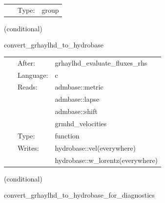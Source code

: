 \documentclass{article}
\begin{document}
 \begin{tabular*}{160mm}{cll} 
~ & Type:  & group \\ 
\end{tabular*} 


\vspace{5mm}

   (conditional) 

\hspace{5mm} convert\_grhaylhd\_to\_hydrobase 

\hspace{5mm}{\it convert needed hydrobase variables for nrpyleakage } 


\hspace{5mm}

 \begin{tabular*}{160mm}{cll} 
~ & After:  & grhaylhd\_evaluate\_fluxes\_rhs \\ 
~ & Language:  & c \\ 
~ & Reads:  & admbase::metric \\ 
~& ~ &admbase::lapse\\ 
~& ~ &admbase::shift\\ 
~& ~ &grmhd\_velocities\\ 
~ & Type:  & function \\ 
~ & Writes:  & hydrobase::vel(everywhere) \\ 
~& ~ &hydrobase::w\_lorentz(everywhere)\\ 
\end{tabular*} 


\vspace{5mm}

   (conditional) 

\hspace{5mm} convert\_grhaylhd\_to\_hydrobase\_for\_diagnostics 

\hspace{5mm}{\it convert grhaylhd-native variables to hydrobase } 


\hspace{5mm}
\end{document}
